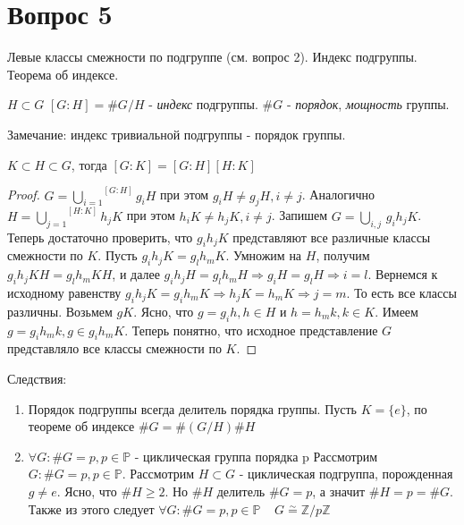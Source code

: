 \section{Вопрос 5}

Левые классы смежности по подгруппе (см. вопрос 2). Индекс подгруппы. Теорема об индексе.

\begin{defn}
  $ H \subset G $ \newline
  $ [G:H] = \#G/H $ - \emph{индекс} подгруппы. \newline
  $ \#G $ - \emph{порядок}, \emph{мощность} группы. 
\end{defn}

Замечание: индекс тривиальной подгруппы - порядок группы.

\begin{thm}
  $ K \subset H \subset G $, \newline тогда $ [G:K] = [G:H][H:K] $
\end{thm}
\begin{proof}
  $ G = \overset{[G:H]}{\underset{i=1}{\bigcup}} g_{i}H $ при этом $ g_{i}H \ne g_{j}H, i \ne j $. 
  Аналогично $ H = \overset{[H:K]}{\underset{j=1}\bigcup} h_{j}K $ при этом $ h_{i}K \ne h_{j}K, i \ne j $. 
  Запишем $ G = \underset{i, j}\bigcup \, g_{i}h_{j}K $. \newline
  Теперь достаточно проверить, что $ g_{i}h_{j}K $ представляют все различные классы смежности по $ K $.
  Пусть $ g_{i}h_{j}K = g_{l}h_{m}K $. Умножим на $ H $, получим $ g_{i}h_{j}KH = g_{l}h_{m}KH $, и далее
  $ g_{i}h_{j}H = g_{l}h_{m}H \Rightarrow  g_{i}H = g_{l}H \Rightarrow i = l $. Вернемся к исходному равенству
  $ g_{i}h_{j}K = g_{i}h_{m}K \Rightarrow h_{j}K = h_{m}K \Rightarrow j = m $. То есть все классы различны. \newline
  Возьмем $ gK $. Ясно, что $ g = g_{i}h, h \in H $ и $ h = h_{m}k, k \in K $. Имеем 
  $ g = g_{i}h_{m}k, g \in g_{i}h_{m}K $. Теперь понятно, что исходное представление $ G $ представляло все классы
  смежности по $ K $.
\end{proof}

Следствия:

\begin{enumerate}
  \item Порядок подгруппы всегда делитель порядка группы. \newline
    Пусть $ K = \{e\} $, по теореме об индексе $ \#G = \#(G/H)\#H $
  \item $ \forall G : \#G = p, p \in \mathbb{P} $ - циклическая группа порядка p \newline
    Рассмотрим $ G : \#G = p, p \in \mathbb{P} $. Рассмотрим $ H \subset G $ - циклическая подгруппа,
    порожденная $ g \ne e $. Ясно, что $ \#H \ge 2 $. Но $ \#H $ делитель $ \#G = p $, а значит
    $ \#H = p = \# G $. Также из этого следует $ \forall G : \#G = p, p \in \mathbb{P} \;\;\;\; 
    G \overset\sim{=} \mathbb{Z}/p\mathbb{Z} $
\end{enumerate}
